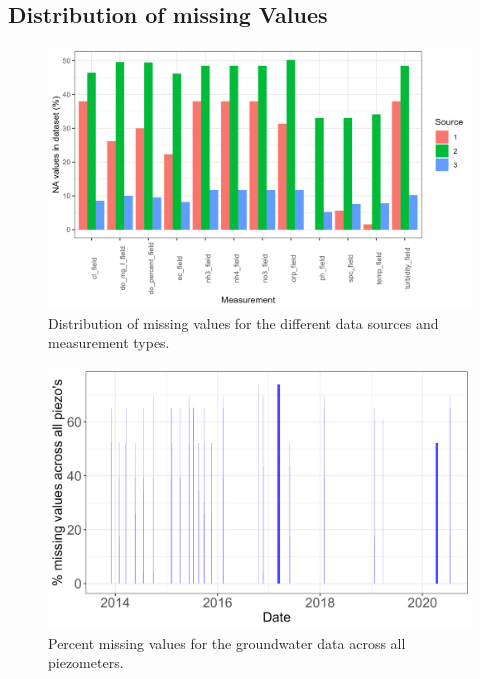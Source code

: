 \documentclass[, manuscript]{copernicus}
\begin{document}
\subsection{Distribution of missing Values}

\clearpage

\begin{figure}
\includegraphics[width=0.9\linewidth]{Figures/na_count} \caption{Distribution of missing values for the different data sources and measurement types.}\label{fig:na-plot}
\end{figure}

\begin{figure}
\includegraphics[width=0.9\linewidth]{Figures/na_GW} \caption{Percent missing values for the groundwater data across all piezometers.}\label{fig:gw-na-plot}
\end{figure}
\end{document}
